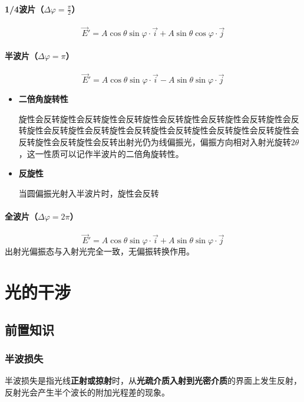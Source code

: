 \documentclass{article}
\begin{document}
	\paragraph{1/4波片（\(\Delta\varphi=\frac{\pi}{2}\)）}
	\[
	\vec{E}' = A\cos\theta\sin\varphi \cdot\vec{i} + A\sin\theta\cos\varphi \cdot\vec{j}
	\]
	
	\paragraph{半波片（\(\Delta\varphi=\pi\)）}
	\[
	\vec{E}' = A\cos\theta\sin\varphi \cdot\vec{i} - A\sin\theta\sin\varphi \cdot\vec{j}
	\]

	
	\begin{itemize}[leftmargin=2em]
		\item \textbf{二倍角旋转性}
		
		旋性会反转旋性会反转旋性会反转旋性会反转旋性会反转旋性会反转旋性会反转旋性会反转旋性会反转旋性会反转旋性会反转旋性会反转旋性会反转旋性会反转旋性会反转旋性会反转出射光仍为线偏振光，偏振方向相对入射光旋转\(2\theta\)，这一性质可以记作半波片的二倍角旋转性。
		
		\item \textbf{反旋性} 
		
			当圆偏振光射入半波片时，旋性会反转
		
	\end{itemize}
	
	\paragraph{全波片（\(\Delta\varphi=2\pi\)）}
	\[
	\vec{E}' = A\cos\theta\sin\varphi \cdot\vec{i} + A\sin\theta\sin\varphi \cdot\vec{j}
	\]
	出射光偏振态与入射光完全一致，无偏振转换作用。
	
	\section{光的干涉}
	
	\subsection{前置知识}
	\subsubsection{半波损失}
	半波损失是指光线\textbf{正射或掠射}时，从\textbf{光疏介质入射到光密介质}的界面上发生反射，反射光会产生半个波长的附加光程差的现象。
	
\end{document}
